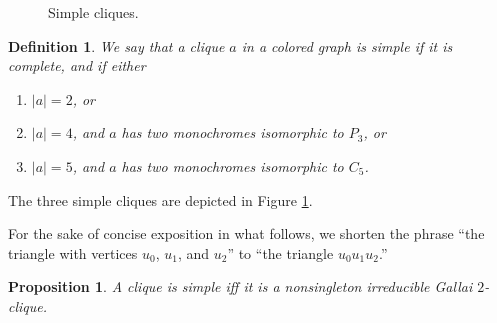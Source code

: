 \documentclass[12pt]{amsart}
\theoremstyle{plain}
\newtheorem{definition}[theorem]{Definition}
\newtheorem{proposition}[theorem]{Proposition}
\numberwithin{equation}{section}
\begin{document}
\setlength{\unitlength}{1.2mm}
\begin{figure}[th]
\begin{center}



\end{center}
\caption{Simple cliques.} \label{Fg:SimpleGallai}
\end{figure}

\begin{definition}
\label{Def:SimFacCliq}We say that a clique $a$ in a colored graph is
\emph{simple} if it is complete, and if either

\begin{enumerate}
\item $\left\vert a\right\vert =2$, or

\item $\left\vert a\right\vert =4$, and $a$ has two monochromes isomorphic to
$P_{3}$, or

\item $\left\vert a\right\vert =5$, and $a$ has two monochromes isomorphic to
$C_{5}$.
\end{enumerate}
\end{definition}

The three simple cliques are depicted in Figure \ref{Fg:SimpleGallai}.

For the sake of concise exposition in what follows, we shorten the phrase ``the
triangle with vertices $u_{0}$, $u_{1}$, and $u_{2}$'' to ``the triangle
$u_{0}u_{1}u_{2}$.''

\begin{proposition}
\label{Pr:SimFacCliq}A clique is simple iff it is a nonsingleton irreducible
Gallai $2$-clique.
\end{proposition}
\end{document}
